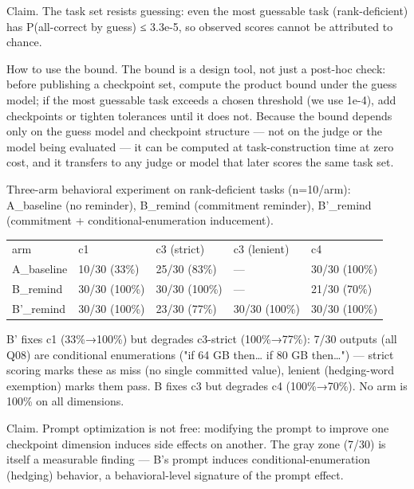 \documentclass[10pt,twocolumn]{article}
\begin{document}
Claim. The task set resists guessing: even the most guessable task (rank-deficient) has P(all-correct by guess) ≤ 3.3e-5, so observed scores cannot be attributed to chance.


How to use the bound. The bound is a design tool, not just a post-hoc check: before publishing a checkpoint set, compute the product bound under the guess model; if the most guessable task exceeds a chosen threshold (we use 1e-4), add checkpoints or tighten tolerances until it does not. Because the bound depends only on the guess model and checkpoint structure — not on the judge or the model being evaluated — it can be computed at task-construction time at zero cost, and it transfers to any judge or model that later scores the same task set.


Three-arm behavioral experiment on rank-deficient tasks (n=10/arm): A\_baseline (no reminder), B\_remind (commitment reminder), B'\_remind (commitment + conditional-enumeration inducement).


\begin{table}[h]
\centering
\begin{tabular}{lllll}
arm & c1 & c3 (strict) & c3 (lenient) & c4 \\
A\_baseline & 10/30 (33\%) & 25/30 (83\%) & — & 30/30 (100\%) \\
B\_remind & 30/30 (100\%) & 30/30 (100\%) & — & 21/30 (70\%) \\
B'\_remind & 30/30 (100\%) & 23/30 (77\%) & 30/30 (100\%) & 30/30 (100\%)
\end{tabular}
\end{table}


B' fixes c1 (33\%→100\%) but degrades c3-strict (100\%→77\%): 7/30 outputs (all Q08) are conditional enumerations ("if 64 GB then… if 80 GB then…") — strict scoring marks these as miss (no single committed value), lenient (hedging-word exemption) marks them pass. B fixes c3 but degrades c4 (100\%→70\%). No arm is 100\% on all dimensions.


Claim. Prompt optimization is not free: modifying the prompt to improve one checkpoint dimension induces side effects on another. The gray zone (7/30) is itself a measurable finding — B's prompt induces conditional-enumeration (hedging) behavior, a behavioral-level signature of the prompt effect.
\end{document}
